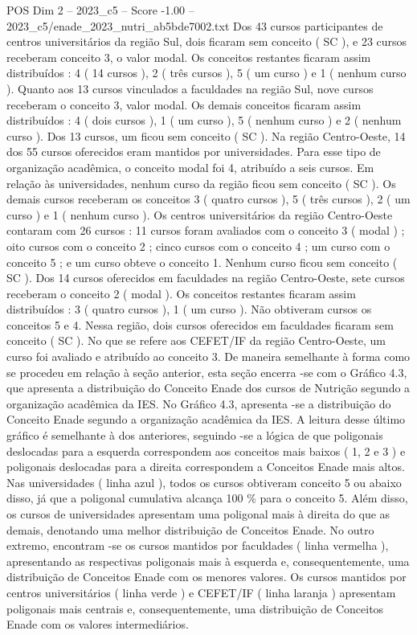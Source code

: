 \begin{textsample}{POS Dim 2 – 2023\_c5 – Score -1.00 – 2023\_c5/enade\_2023\_nutri\_ab5bde7002.txt}
Dos 43 cursos participantes de centros universitários da região Sul, dois ficaram sem conceito ( SC ), e 23 cursos receberam conceito 3, o valor modal.
Os conceitos restantes ficaram assim distribuídos : 4 ( 14 cursos ), 2 ( três cursos ), 5 ( um curso ) e 1 ( nenhum curso ).
Quanto aos 13 cursos vinculados a faculdades na região Sul, nove cursos receberam o conceito 3, valor modal.
Os demais conceitos ficaram assim distribuídos : 4 ( dois cursos ), 1 ( um curso ), 5 ( nenhum curso ) e 2 ( nenhum curso ).
Dos 13 cursos, um ficou sem conceito ( SC ).
Na região Centro-Oeste, 14 dos 55 cursos oferecidos eram mantidos por universidades.
Para esse tipo de organização acadêmica, o conceito modal foi 4, atribuído a seis cursos.
Em relação às universidades, nenhum curso da região ficou sem conceito ( SC ).
Os demais cursos receberam os conceitos 3 ( quatro cursos ), 5 ( três cursos ), 2 ( um curso ) e 1 ( nenhum curso ).
Os centros universitários da região Centro-Oeste contaram com 26 cursos : 11 cursos foram avaliados com o conceito 3 ( modal ) ; oito cursos com o conceito 2 ; cinco cursos com o conceito 4 ; um curso com o conceito 5 ; e um curso obteve o conceito 1.
Nenhum curso ficou sem conceito ( SC ).
Dos 14 cursos oferecidos em faculdades na região Centro-Oeste, sete cursos receberam o conceito 2 ( modal ).
Os conceitos restantes ficaram assim distribuídos : 3 ( quatro cursos ), 1 ( um curso ).
Não obtiveram cursos os conceitos 5 e 4.
Nessa região, dois cursos oferecidos em faculdades ficaram sem conceito ( SC ).
No que se refere aos CEFET/IF da região Centro-Oeste, um curso foi avaliado e atribuído ao conceito 3.
De maneira semelhante à forma como se procedeu em relação à seção anterior, esta seção encerra -se com o Gráfico 4.3, que apresenta a distribuição do Conceito Enade dos cursos de Nutrição segundo a organização acadêmica da IES.
No Gráfico 4.3, apresenta -se a distribuição do Conceito Enade segundo a organização acadêmica da IES.
A leitura desse último gráfico é semelhante à dos anteriores, seguindo -se a lógica de que poligonais deslocadas para a esquerda correspondem aos conceitos mais baixos ( 1, 2 e 3 ) e poligonais deslocadas para a direita correspondem a Conceitos Enade mais altos.
Nas universidades ( linha azul ), todos os cursos obtiveram conceito 5 ou abaixo disso, já que a poligonal cumulativa alcança 100 \% para o conceito 5.
Além disso, os cursos de universidades apresentam uma poligonal mais à direita do que as demais, denotando uma melhor distribuição de Conceitos Enade.
No outro extremo, encontram -se os cursos mantidos por faculdades ( linha vermelha ), apresentando as respectivas poligonais mais à esquerda e, consequentemente, uma distribuição de Conceitos Enade com os menores valores.
Os cursos mantidos por centros universitários ( linha verde ) e CEFET/IF ( linha laranja ) apresentam poligonais mais centrais e, consequentemente, uma distribuição de Conceitos Enade com os valores intermediários.

\end{textsample}
